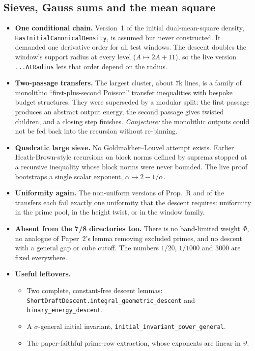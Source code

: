\documentclass[11pt,a4paper]{article}
\newcommand{\lean}[1]{\nolinkurl{#1}}
\begin{document}
\subsection{Sieves, Gauss sums and the mean square}
\begin{itemize}
\item \textbf{One conditional chain.} Version~1 of the initial dual-mean-square density,
\lean{HasInitialCanonicalDensity}, is assumed but never constructed. It demanded one derivative
order for all test windows. The descent doubles the window's support radius at every level ($A\mapsto
2A+11$), so the live version \lean{...AtRadius} lets that order depend on the radius.
\item \textbf{Two-passage transfers.} The largest cluster, about $7$k lines, is a family of
monolithic ``first-plus-second Poisson'' transfer inequalities with bespoke budget structures. They
were superseded by a modular split: the first passage produces an abstract output energy, the second
passage gives twisted children, and a closing step finishes. \emph{Conjecture:} the monolithic
outputs could not be fed back into the recursion without re-binning.
\item \textbf{Quadratic large sieve.} No Goldmakher--Louvel attempt exists. Earlier Heath-Brown-style
recursions on block norms defined by suprema stopped at a recursive inequality whose block norms
were never bounded. The live proof bootstraps a single scalar exponent, $\alpha\mapsto2-1/\alpha$.
\item \textbf{Uniformity again.} The non-uniform versions of Prop.~R and of the transfers each fail
exactly one uniformity that the descent requires: uniformity in the prime pool, in the height twist,
or in the window family.
\item \textbf{Absent from the 7/8 directories too.} There is no band-limited weight $\Phi$, no
analogue of Paper~2's lemma removing excluded primes, and no descent with a general gap or cube
cutoff. The numbers $1/20$, $1/1000$ and $3000$ are fixed everywhere.
\item \textbf{Useful leftovers.}
\begin{itemize}
\item Two complete, constant-free descent lemmas: \lean{ShortDraftDescent.integral_geometric_descent}
and \lean{binary_energy_descent}.
\item A $\sigma$-general initial invariant, \lean{initial_invariant_power_general}.
\item The paper-faithful prime-row extraction, whose exponents are linear in $\vartheta$.
\end{itemize}
\end{itemize}
\end{document}
